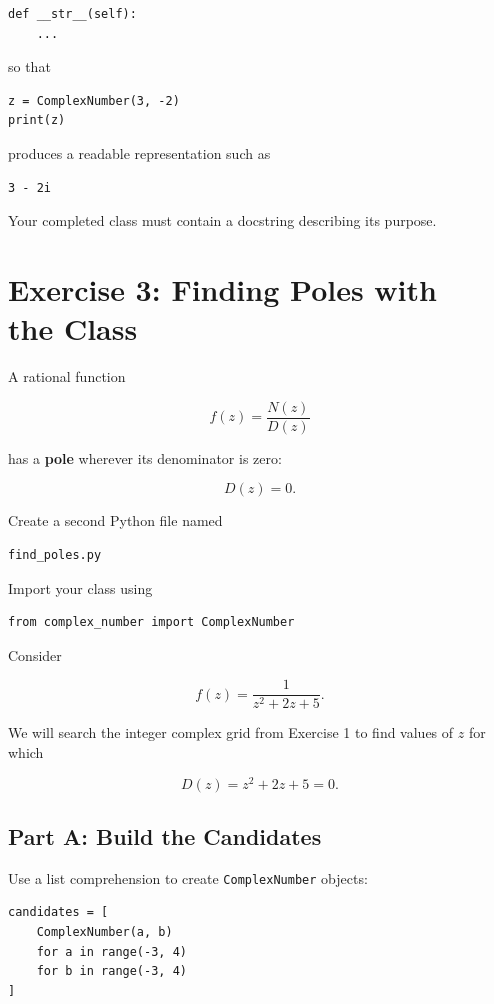 \documentclass{article}
\begin{document}
\begin{verbatim}
def __str__(self):
    ...
\end{verbatim}

so that

\begin{verbatim}
z = ComplexNumber(3, -2)
print(z)
\end{verbatim}

produces a readable representation such as

\begin{verbatim}
3 - 2i
\end{verbatim}

Your completed class must contain a docstring describing its
purpose.


\section*{Exercise 3: Finding Poles with \\ the Class}

A rational function

\[
f(z)=\frac{N(z)}{D(z)}
\]

has a \textbf{pole} wherever its denominator is zero:

\[
D(z)=0.
\]

Create a second Python file named

\begin{verbatim}
find_poles.py
\end{verbatim}

Import your class using

\begin{verbatim}
from complex_number import ComplexNumber
\end{verbatim}

Consider

\[
f(z)
=
\frac{1}
{z^2+2z+5}.
\]

We will search the integer complex grid from Exercise 1 to find
values of \(z\) for which

\[
D(z)=z^2+2z+5=0.
\]

\subsection*{Part A: Build the Candidates}

Use a list comprehension to create \texttt{ComplexNumber}
objects:

\begin{verbatim}
candidates = [
    ComplexNumber(a, b)
    for a in range(-3, 4)
    for b in range(-3, 4)
]
\end{verbatim}
\end{document}
